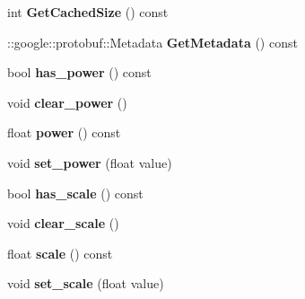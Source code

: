 \begin{DoxyCompactItemize}
\item 
\mbox{\label{classcaffe_1_1_power_parameter_a01b38e9f1ca732601c5021501eb0a0cb}} 
int {\bfseries Get\+Cached\+Size} () const
\item 
\mbox{\label{classcaffe_1_1_power_parameter_a2a16214a729e388a0321e53914c787d3}} 
\+::google\+::protobuf\+::\+Metadata {\bfseries Get\+Metadata} () const
\item 
\mbox{\label{classcaffe_1_1_power_parameter_ab1168306c6311cd0b400491a5132586d}} 
bool {\bfseries has\+\_\+power} () const
\item 
\mbox{\label{classcaffe_1_1_power_parameter_a8e45cde2aecb17f30ddfade6865a2f70}} 
void {\bfseries clear\+\_\+power} ()
\item 
\mbox{\label{classcaffe_1_1_power_parameter_acd7ebf1cd66fd4fac60009b8528bd1be}} 
float {\bfseries power} () const
\item 
\mbox{\label{classcaffe_1_1_power_parameter_a5054711db03eace626c4a338c7327ac5}} 
void {\bfseries set\+\_\+power} (float value)
\item 
\mbox{\label{classcaffe_1_1_power_parameter_ad8a91ea77f39bd0c3c2849bcd42a782a}} 
bool {\bfseries has\+\_\+scale} () const
\item 
\mbox{\label{classcaffe_1_1_power_parameter_aad34de253733a9b6388f9ec3f0e934ba}} 
void {\bfseries clear\+\_\+scale} ()
\item 
\mbox{\label{classcaffe_1_1_power_parameter_a752367b74de966823c959f8f1a338580}} 
float {\bfseries scale} () const
\item 
\mbox{\label{classcaffe_1_1_power_parameter_a0b7f2ad02f05f03d0cbf6fa711219732}} 
void {\bfseries set\+\_\+scale} (float value)
\item 
\mbox{\label{classcaffe_1_1_power_parameter_a9104f46440421dc73f662b1fe689b33a}} 

\end{DoxyCompactItemize}
